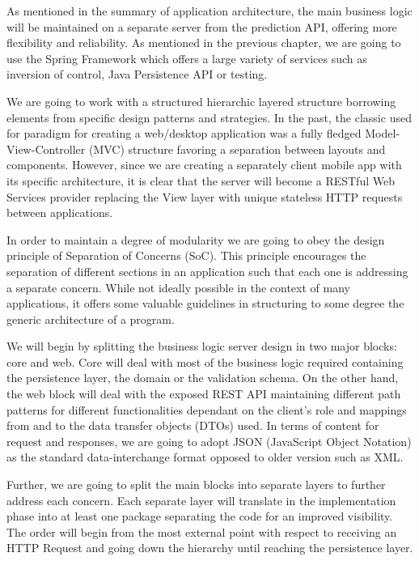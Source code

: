 As mentioned in the summary of application architecture, the main business logic will be maintained on a separate server  from the prediction API, offering more flexibility and reliability. As mentioned in the previous chapter, we are going to use the Spring Framework which offers a large variety of services such as inversion of control, Java Persistence API or testing.

We are going to work with a structured hierarchic layered structure borrowing elements from specific design patterns and strategies. In the past, the classic used for paradigm for creating a web/desktop application was a fully fledged Model-View-Controller (MVC) structure favoring a separation between layouts and components. However, since we are creating a separately client mobile app with its specific architecture, it is clear that the server will become a RESTful Web Services provider replacing the View layer with unique stateless HTTP requests between applications.

In order to maintain a degree of modularity we are going to obey the design principle of Separation of Concerns (SoC). This principle encourages the separation of different sections in an application such that each one is addressing a separate concern. While not ideally possible in the context of many applications, it offers some valuable guidelines in structuring to some degree the generic architecture of a program.

We will begin by splitting the business logic server design in two major blocks: core and web. Core will deal with most of the business logic required containing the persistence layer, the domain or the validation schema. On the other hand, the web block will deal with the exposed REST API maintaining different path patterns for different functionalities dependant on the client's role and mappings from and to the data transfer objects (DTOs) used. In terms of content for request and responses, we are going to adopt JSON (JavaScript Object Notation) as the standard data-interchange format opposed to older version such as XML.

Further, we are going to split the main blocks into separate layers to further address each concern. Each separate layer will translate in the implementation phase into at least one package separating the code for an improved visibility. The order will begin from the most external point with respect to receiving an HTTP Request and going down the hierarchy until reaching the persistence layer.

